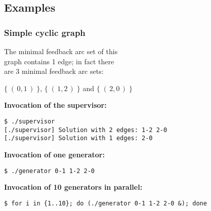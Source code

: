 \clearpage
\subsection*{Examples}
\setlength{\columnsep}{-20mm}

\begin{multicols}{2}
\subsubsection*{Simple cyclic graph}


\vfill

The minimal feedback arc set of this\\
graph contains 1 edge; in fact there\\
are 3 minimal feedback arc sets:

$\{\;(\,0,1\,)\;\}$, $\{\;(\,1,2\,)\;\}$ and $\{\;(\,2,0\,)\;\}$

\columnbreak

\textbf{Invocation of the supervisor:}
\vspace{-5mm}
\begin{verbatim}
$ ./supervisor
[./supervisor] Solution with 2 edges: 1-2 2-0
[./supervisor] Solution with 1 edges: 2-0
\end{verbatim}

\textbf{Invocation of one generator:}
\vspace{-5mm}
\begin{verbatim}
$ ./generator 0-1 1-2 2-0
\end{verbatim}

\textbf{Invocation of 10 generators in parallel:}
\vspace{-5mm}
\begin{verbatim}
$ for i in {1..10}; do (./generator 0-1 1-2 2-0 &); done
\end{verbatim}
\end{multicols}

